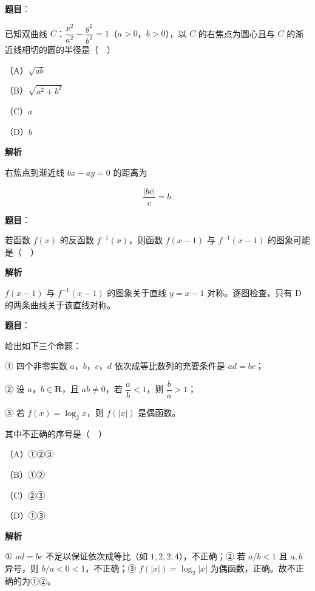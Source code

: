 \begin{answer}

\textbf{题目}：

已知双曲线 $C$：$\dfrac{x^2}{a^2}-\dfrac{y^2}{b^2}=1$（$a>0$，$b>0$），以 $C$ 的右焦点为圆心且与 $C$ 的渐近线相切的圆的半径是（　）

（A）$\sqrt{ab}$

（B）$\sqrt{a^2+b^2}$

（C）$a$

（D）$b$

\textbf{解析}

右焦点到渐近线 $bx-ay=0$ 的距离为

\nopagebreak[4]
\[\frac{|bc|}{c}=b.\]


\end{answer}
\begin{answer}

\textbf{题目}：

若函数 $f(x)$ 的反函数 $f^{-1}(x)$，则函数 $f(x-1)$ 与 $f^{-1}(x-1)$ 的图象可能是（　）
\nopagebreak[4]
\begin{center}\end{center}
\nopagebreak[4]
\textbf{解析}

$f(x-1)$ 与 $f^{-1}(x-1)$ 的图象关于直线 $y=x-1$ 对称。逐图检查，只有 D 的两条曲线关于该直线对称。


\end{answer}
\begin{answer}

\textbf{题目}：

给出如下三个命题：

① 四个非零实数 $a$，$b$，$c$，$d$ 依次成等比数列的充要条件是 $ad=bc$；

② 设 $a$，$b\in\mathbf R$，且 $ab\neq0$，若 $\dfrac ab<1$，则 $\dfrac ba>1$；

③ 若 $f(x)=\log_2x$，则 $f(|x|)$ 是偶函数。

其中不正确的序号是（　）

（A）①②③

（B）①②

（C）②③

（D）①③

\textbf{解析}

① $ad=bc$ 不足以保证依次成等比（如 $1,2,2,4$），不正确；② 若 $a/b<1$ 且 $a,b$ 异号，则 $b/a<0<1$，不正确；③ $f(|x|)=\log_2|x|$ 为偶函数，正确。故不正确的为①②。


\end{answer}
